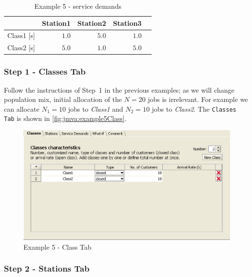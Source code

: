 \begin{table}[htbp]
\begin{center}
\begin{tabular}{c|r|r|r|r|}
& \multicolumn{1}{c|}{Station1} & \multicolumn{1}{c|}{Station2} & \multicolumn{1}{c|}{Station3} \\
\hline
Class1 [s]& $1.0$ & $5.0$ & $1.0$ \\
Class2 [s]& $5.0$ & $1.0$ & $5.0$ \\
\hline
\end{tabular}
\end{center}
\caption{Example 5 - service demands}
\label{tab:jmva:example5ServDemands}
\end{table}

\subsubsection{Step 1 - Classes Tab}

Follow the instructions of Step~1 in the previous examples; as we
will change population mix, initial allocation of the $N=20$ jobs is
irrelevant. For example we can allocate $N_1=10$ jobs to
\emph{Class1} and $N_2=10$ jobs to \emph{Class2}. The
\texttt{Classes Tab} is shown in \autoref{fig:jmva:example5Class}.

\begin{figure}[htbp]
    \begin{center}
        \includegraphics[scale=.5]{img/jmva/example5Class}
    \end{center}
    \caption{Example 5 - Class Tab}
    \label{fig:jmva:example5Class}
\end{figure}

\subsubsection{Step 2 - Stations Tab}

